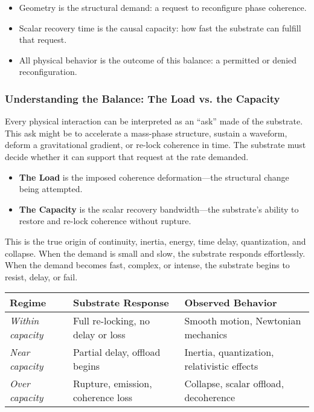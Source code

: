 \documentclass[entropy,article,submit,pdftex,moreauthors]{Definitions/mdpi}
\begin{document}
\begin{itemize}
    \item Geometry is the structural demand: a request to reconfigure phase coherence.
    \item Scalar recovery time is the causal capacity: how fast the substrate can fulfill that request.
    \item All physical behavior is the outcome of this balance: a permitted or denied reconfiguration.
\end{itemize}

\subsubsection*{Understanding the Balance: The Load vs. the Capacity}

Every physical interaction can be interpreted as an “ask” made of the substrate. This ask might be to accelerate a mass-phase structure, sustain a waveform, deform a gravitational gradient, or re-lock coherence in time. The substrate must decide whether it can support that request at the rate demanded.

\begin{itemize}
    \item \textbf{The Load} is the imposed coherence deformation—the structural change being attempted.
    \item \textbf{The Capacity} is the scalar recovery bandwidth—the substrate’s ability to restore and re-lock coherence without rupture.
\end{itemize}

This is the true origin of continuity, inertia, energy, time delay, quantization, and collapse. When the demand is small and slow, the substrate responds effortlessly. When the demand becomes fast, complex, or intense, the substrate begins to resist, delay, or fail.

\begin{center}
\vspace{0.5em}
\renewcommand{\arraystretch}{1.1}
\begin{tabular}{|p{2.5cm}|p{5.0cm}|p{4.8cm}|}
\hline
\textbf{Regime} & \textbf{Substrate Response} & \textbf{Observed Behavior} \\
\hline
\textit{Within capacity} & Full re-locking, no delay or loss & Smooth motion, Newtonian mechanics \\
\textit{Near capacity} & Partial delay, offload begins & Inertia, quantization, relativistic effects \\
\textit{Over capacity} & Rupture, emission, coherence loss & Collapse, scalar offload, decoherence \\
\hline
\end{tabular}
\vspace{0.5em}
\end{center}
\end{document}

